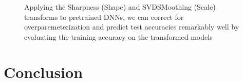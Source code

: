 \documentclass{article}
\newcommand{\charles}[1]{{\color{blue}\sf{[Charles: #1]}}}
\begin{document}

\begin{figure}[t!] 
    \centering
    \caption{Applying the Sharpness (Shape) and SVDSMoothing (Scale) transforms to pretrained DNNs, we can correct for overparemeterization and predict test accuracies remarkably well by evaluating the training accuracy on the transformed models}
    \label{fig:smoothing}
\end{figure} 

\section*{Conclusion}
\end{document}
